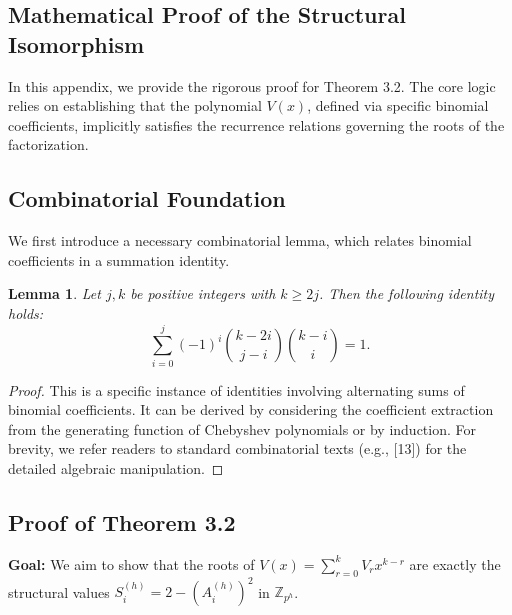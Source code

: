 \documentclass[12pt]{article}
\theoremstyle{plain}
\newtheorem{lem}{Lemma}
\numberwithin{equation}{section}
\begin{document}
\appendix
\begin{appendix}
\section{Mathematical Proof of the Structural Isomorphism}
\label{app:proof}

In this appendix, we provide the rigorous proof for Theorem 3.2. The core logic relies on establishing that the polynomial $V(x)$, defined via specific binomial coefficients, implicitly satisfies the recurrence relations governing the roots of the factorization.

\subsection{Combinatorial Foundation}

We first introduce a necessary combinatorial lemma, which relates binomial coefficients in a summation identity.

\begin{lem} \label{lemma:comb}
Let $j, k$ be positive integers with $k \ge 2j$. Then the following identity holds:
\begin{equation}
    \sum_{i=0}^{j} (-1)^i \binom{k-2i}{j-i} \binom{k-i}{i} = 1.
\end{equation}
\end{lem}
\begin{proof}
This is a specific instance of identities involving alternating sums of binomial coefficients. It can be derived by considering the coefficient extraction from the generating function of Chebyshev polynomials or by induction. For brevity, we refer readers to standard combinatorial texts (e.g., [13]) for the detailed algebraic manipulation.
\end{proof}

\subsection{Proof of Theorem 3.2}

\textbf{Goal:} We aim to show that the roots of $V(x) = \sum_{r=0}^k V_r x^{k-r}$ are exactly the structural values $S_i^{(h)} = 2 - (A_i^{(h)})^2$ in $\mathbb{Z}_{p^h}$.


\end{appendix}
\end{document}
